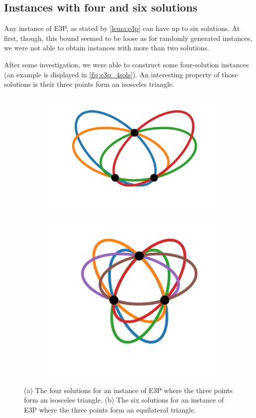 \subsection{Instances with four and six solutions}

Any instance of E3P, as stated by \autoref{lema:e3p} can have up to six solutions. At first, though, this bound seemed to be loose as for randomly generated instances, we were not able to obtain instances with more than two solutions.

After some investigation, we were able to construct some four-solution instances (an example is displayed in \autoref{fig:e3p_4sols}). An interesting property of those solutions is their three points form an isosceles triangle.

\begin{figure}[!htb]
	\begin{subfigure}{.5\textwidth}
		\centering
		\includegraphics[scale=.9]{figures/e3p_4sols}
		\caption{}
		\label{fig:e3p_4sols}
	\end{subfigure}
	\begin{subfigure}{.5\textwidth}
		\centering
		\includegraphics[scale=.9]{figures/e3p_6sols}
		\caption{}
		\label{fig:e3p_6sols}
	\end{subfigure}
\caption{(a) The four solutions for an instance of E3P where the three points form an isosceles triangle. (b) The six solutions for an instance of E3P where the three points form an equilateral triangle.}
\end{figure}


